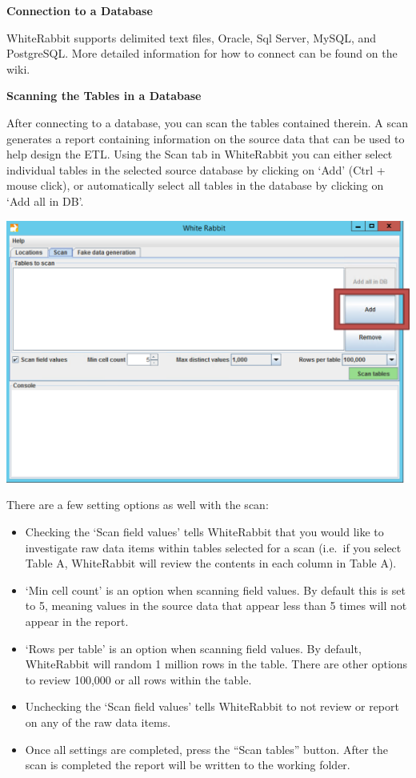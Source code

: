 \documentclass[11pt]{book}
\providecommand{\tightlist}{%
  \setlength{\itemsep}{0pt}\setlength{\parskip}{0pt}}
\theoremstyle{definition}
\theoremstyle{definition}
\theoremstyle{definition}
\theoremstyle{remark}
\begin{document}
\textbf{Connection to a Database}

WhiteRabbit supports delimited text files, Oracle, Sql Server, MySQL, and PostgreSQL. More detailed information for how to connect can be found on the wiki.

\textbf{Scanning the Tables in a Database}

After connecting to a database, you can scan the tables contained therein. A scan generates a report containing information on the source data that can be used to help design the ETL. Using the Scan tab in WhiteRabbit you can either select individual tables in the selected source database by clicking on `Add' (Ctrl + mouse click), or automatically select all tables in the database by clicking on `Add all in DB'.

\includegraphics[width=1\linewidth]{images/ExtractTransformLoad/WhiteRabbitAddTables}

There are a few setting options as well with the scan:

\begin{itemize}
\tightlist
\item
  Checking the `Scan field values' tells WhiteRabbit that you would like to investigate raw data items within tables selected for a scan (i.e.~if you select Table A, WhiteRabbit will review the contents in each column in Table A).
\item
  `Min cell count' is an option when scanning field values. By default this is set to 5, meaning values in the source data that appear less than 5 times will not appear in the report.
\item
  `Rows per table' is an option when scanning field values. By default, WhiteRabbit will random 1 million rows in the table. There are other options to review 100,000 or all rows within the table.
\item
  Unchecking the `Scan field values' tells WhiteRabbit to not review or report on any of the raw data items.
\item
  Once all settings are completed, press the ``Scan tables'' button. After the scan is completed the report will be written to the working folder.
\end{itemize}
\end{document}
